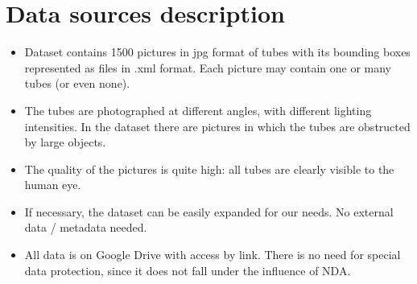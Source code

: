 \section{Data sources description}

\begin{itemize}
	\item Dataset contains 1500 pictures in jpg format of tubes with its bounding boxes represented as files in .xml format. Each picture may contain one or many tubes (or even none).
	
	\item The tubes are photographed at different angles, with different lighting intensities. In the dataset there are pictures in which the tubes are obstructed by large objects.
	
	\item The quality of the pictures is quite high: all tubes are clearly visible to the human eye.
	
	\item If necessary, the dataset can be easily expanded for our needs. No external data / metadata needed.
	
	\item All data is on Google Drive with access by link. There is no need for special data protection, since it does not fall under the influence of NDA.
\end{itemize}



